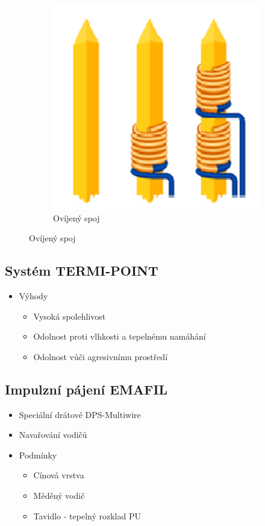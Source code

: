 \documentclass{article}
\begin{document}
\begin{figure}[H]
\begin{minipage}[t]{0.4\textwidth}
    \begin{figure}[H]
      \centering
      \includegraphics[width=\textwidth]{ovijen2.png}
      \caption{Ovíjený spoj}
    \end{figure}
  \end{minipage}
\end{figure}

\subsection{Systém TERMI-POINT}
\begin{itemize}
  \item Výhody
  \begin{itemize}
    \item Vysoká spolehlivost
    \item Odolnost proti vlhkosti a tepelnému namáhání
    \item Odolnost vůči agresivnímu prostředí
  \end{itemize}
\end{itemize}

\subsection{Impulzní pájení EMAFIL}
\begin{itemize}
  \item Speciální drátové DPS-Multiwire
  \item Navařování vodičů
  \item Podmínky
  \begin{itemize}
    \item Cínová vrstva
    \item Měděný vodič
    \item Tavidlo - tepelný rozklad PU
  \end{itemize}
\end{itemize}
\end{document}

